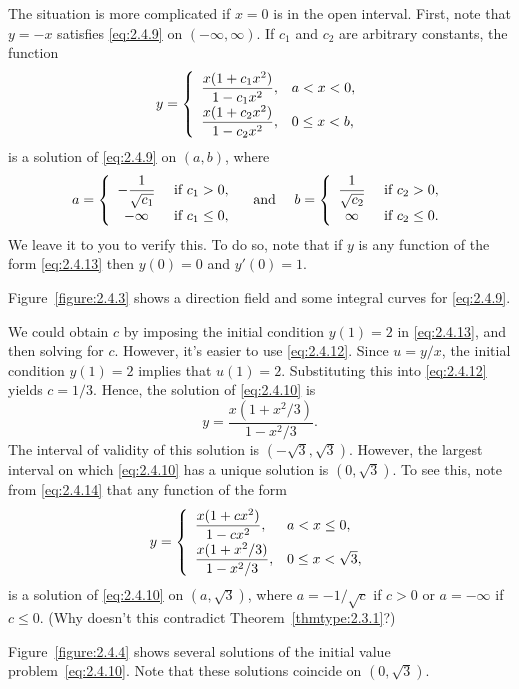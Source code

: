 \begin{examplesolution}
The situation is more complicated if $x=0$ is in the open interval. First, note that $y=-x$ satisfies
\eqref{eq:2.4.9} on $(-\infty,\infty)$. If $c_{1}$ and $c_{2}$ are arbitrary constants, the function
\begin{equation}
  \label{eq:2.4.14}y=\left\{
  \begin{array}{ll}
    \dst\frac{x(1+c_{1}x^{2})}{1-c_{1}x^{2}},        & a<x<0,    \\
    [2\jot]\dst\frac{x(1+c_{2}x^{2})}{1-c_{2}x^{2}}, & 0\le x<b,
  \end{array}\right.
\end{equation}
is a solution of \eqref{eq:2.4.9} on $(a,b)$, where
\[
  a=\left\{
  \begin{array}{cl}
    -\dst\frac{1}{\sqrt{c_{1}}} & \mbox{ if }c_{1}>0,   \\
    -\infty                     & \mbox{ if }c_{1}\le0,
  \end{array}\right.\mbox{\quad and \quad}b=\left\{
  \begin{array}{cl}
    \dst\frac{1}{\sqrt{c_{2}}} & \mbox{ if }c_{2}>0,   \\
    \infty                     & \mbox{ if }c_{2}\le0.
  \end{array}\right.
\]
We leave it to you to verify this. To do so, note that if $y$ is any function of the form
\eqref{eq:2.4.13} then $y(0)=0$ and $y'(0)=1$.

Figure~\ref{figure:2.4.3} shows a direction field and some integral curves for \eqref{eq:2.4.9}.

 We could obtain $c$ by imposing the initial condition $y(1)=2$ in
\eqref{eq:2.4.13}, and then solving for $c$. However, it's easier to use \eqref{eq:2.4.12}. Since
$u=y/x$, the initial condition $y(1)=2$ implies that $u(1)=2$. Substituting this into
\eqref{eq:2.4.12} yields $c=1/3$. Hence, the solution of \eqref{eq:2.4.10} is
\[
  y=\frac{x(1+x^{2}/3)}{1-x^{2}/3}.
\]
The interval of validity of this solution is $(-\sqrt{3},\sqrt{3})$. However, the largest interval
on which \eqref{eq:2.4.10} has a unique solution is $(0,\sqrt{3})$. To see this, note from
\eqref{eq:2.4.14} that any function of the form
\begin{equation}
  \label{eq:2.4.15}y=\left\{
  \begin{array}{ll}
    \dst\frac{x(1+cx^{2})}{1-cx^{2}},   & a<x\le0,         \\[2\jot]
    \dst\frac{x(1+x^{2}/3)}{1-x^{2}/3}, & 0\le x<\sqrt{3},
  \end{array}\right.
\end{equation}
is a solution of \eqref{eq:2.4.10} on $(a,\sqrt{3})$, where $a=-1/\sqrt{c}$ if $c>0$ or $a=-\infty$
if $c\le0$. (Why doesn't this contradict Theorem~\ref{thmtype:2.3.1}?)

Figure~\ref{figure:2.4.4} shows several solutions of the initial value problem~\eqref{eq:2.4.10}.
Note that these solutions coincide on $(0,\sqrt{3})$.
\end{examplesolution}

